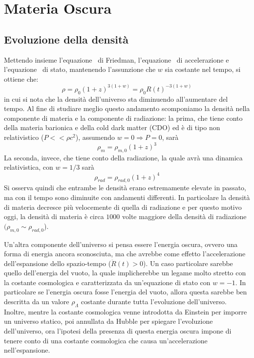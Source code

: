 \section{Materia Oscura}\label{sec:materia-oscura}
\subsection{Evoluzione della densità}\label{sec:evoluazione-densita}
Mettendo insieme l'equazione~ di Friedman, l'equazione~ di accelerazione e l'equazione~ di stato, mantenendo l'assunzione che $w$ sia costante nel tempo, si ottiene che:
\[
    \rho = \rho_0 {(1+z)}^{3(1+w)} = \rho_0 {R(t)}^{-3(1+w)}
\]
in cui si nota che la densità dell'universo sta diminuendo all'aumentare del tempo. Al fine di studiare meglio questo andamento scomponiamo la densità nella componente di materia e la componente di radiazione: la prima, che tiene conto della materia barionica e della cold dark matter (CDO) ed è di tipo non relativistico ($P<<\rho c^2$), assumendo $w = 0 \Rightarrow P=0$, sarà
\[
    \rho_m = \rho_{m,0}{(1+z)}^3
\]
La seconda, invece, che tiene conto della radiazione, la quale avrà una dinamica relativistica, con $w = 1/3$ sarà
\[
    \rho_{rad} = \rho_{rad, 0}{(1+z)}^4
\]
Si osserva quindi che entrambe le densità erano estremamente elevate in passato, ma con il tempo sono diminuite con andamenti differenti. In particolare la densità di materia decresce più velocemente di quella di radiazione e per questo motivo oggi, la densità di materia è circa $1000$ volte maggiore della densità di radiazione $(\rho_{m,0} \sim \rho_{rad, 0}$).

Un'altra componente dell'universo si pensa essere l'energia oscura, ovvero una forma di energia ancora sconosciuta, ma che avrebbe come effetto l'accelerazione dell'espansione dello spazio-tempo ($\ddot{R}(t)>0$). Un caso particolare sarebbe quello dell'energia del vuoto, la quale implicherebbe un legame molto stretto con la costante cosmologica e caratterizzata da un'equazione di stato con $w = -1$. In particolare se l'energia oscura fosse l'energia del vuoto, allora questa sarebbe ben descritta da un valore $\rho_{\Lambda}$ costante durante tutta l'evoluzione dell'universo. Inoltre, mentre la costante cosmologica venne introdotta da Einstein per imporre un universo statico, poi annullata da Hubble per spiegare l'evoluzione dell'universo, ora l'ipotesi della presenza di questa energia oscura impone di tenere conto di una costante cosmologica che causa un'accelerazione nell'espansione.


